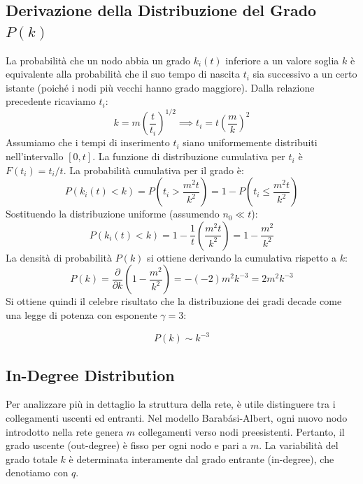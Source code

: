 \subsection{Derivazione della Distribuzione del Grado $P(k)$}

La probabilità che un nodo abbia un grado $k_i(t)$ inferiore a un valore soglia $k$ è equivalente alla probabilità che il suo tempo di nascita $t_i$ sia successivo a un certo istante (poiché i nodi più vecchi hanno grado maggiore).
Dalla relazione precedente ricaviamo $t_i$:
\begin{equation}
    k = m \left( \frac{t}{t_i} \right)^{1/2} \implies t_i = t \left( \frac{m}{k} \right)^2
\end{equation}
Assumiamo che i tempi di inserimento $t_i$ siano uniformemente distribuiti nell'intervallo $[0, t]$. La funzione di distribuzione cumulativa per $t_i$ è $F(t_i) = t_i / t$.
La probabilità cumulativa per il grado è:
\begin{equation}
    P(k_i(t) < k) = P\left( t_i > \frac{m^2 t}{k^2} \right) = 1 - P\left( t_i \le \frac{m^2 t}{k^2} \right)
\end{equation}
Sostituendo la distribuzione uniforme (assumendo $n_0 \ll t$):
\begin{equation}
    P(k_i(t) < k) = 1 - \frac{1}{t} \left( \frac{m^2 t}{k^2} \right) = 1 - \frac{m^2}{k^2}
\end{equation}
La densità di probabilità $P(k)$ si ottiene derivando la cumulativa rispetto a $k$:
\begin{equation}
    P(k) = \frac{\partial}{\partial k} \left( 1 - \frac{m^2}{k^2} \right) = -(-2) m^2 k^{-3} = 2m^2 k^{-3}
\end{equation}
Si ottiene quindi il celebre risultato che la distribuzione dei gradi decade come una legge di potenza con esponente $\gamma = 3$:
\begin{tcolorbox}[colback=colorC!15, colframe=colorC!70!colorB,  title=\textbf{Decadimento della Distribuzione dei Gradi a Legge di Potenza}]
\begin{equation}
    P(k) \sim k^{-3}
    \label{eq: 10.1}
\end{equation}
\end{tcolorbox}

\subsection{In-Degree Distribution}

Per analizzare più in dettaglio la struttura della rete, è utile distinguere tra i collegamenti uscenti ed entranti. Nel modello Barabási-Albert, ogni nuovo nodo introdotto nella rete genera $m$ collegamenti verso nodi preesistenti. Pertanto, il grado uscente (out-degree) è fisso per ogni nodo e pari a $m$.
La variabilità del grado totale $k$ è determinata interamente dal grado entrante (in-degree), che denotiamo con $q$.

